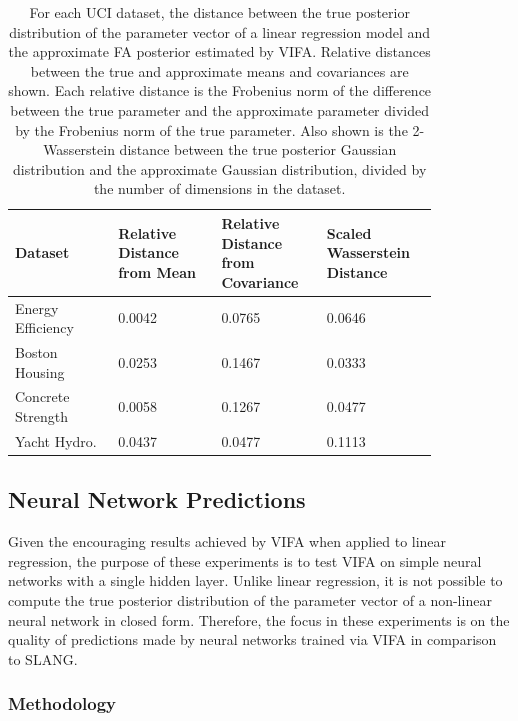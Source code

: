 \documentclass[msc,deptreport.inf]{infthesis} %
\begin{document}
\begin{table}[h!]
	\begin{center}
		\begin{tabular}{|| p{0.21\linewidth} p{0.21\linewidth} p{0.21\linewidth} p{0.21\linewidth} ||} 
 			\hline
 			Dataset & Relative Distance from Mean & Relative Distance from Covariance & Scaled Wasserstein Distance \\ [0.5ex] 
 			\hline\hline
			Energy Efficiency 	& 0.0042 	& 0.0765 & 0.0646 \\ 
			\hline
			Boston Housing 	& 0.0253 	& 0.1467 & 0.0333 \\ 
			\hline
			Concrete Strength 	& 0.0058 	& 0.1267 & 0.0477 \\ 
			\hline
 			Yacht Hydro. 		& 0.0437 	& 0.0477 & 0.1113 \\ [1ex] 
			\hline
		\end{tabular}
		\caption{For each UCI dataset, the distance between the true posterior distribution of the parameter vector of a linear regression model and the approximate FA posterior estimated by VIFA. Relative distances between the true and approximate means and covariances are shown. Each relative distance is the Frobenius norm of the difference between the true parameter and the approximate parameter divided by the Frobenius norm of the true parameter. Also shown is the 2-Wasserstein distance between the true posterior Gaussian distribution and the approximate Gaussian distribution, divided by the number of dimensions in the dataset.}
		\label{table:linear_regression_vi_posterior_uci}
	\end{center}
\end{table}


\subsection{Neural Network Predictions}

Given the encouraging results achieved by VIFA when applied to linear regression, the purpose of these experiments is to test VIFA on simple neural networks with a single hidden layer. Unlike linear regression, it is not possible to compute the true posterior distribution of the parameter vector of a non-linear neural network in closed form. Therefore, the focus in these experiments is on the quality of predictions made by neural networks trained via VIFA in comparison to SLANG. 

\subsubsection{Methodology}
\end{document}
